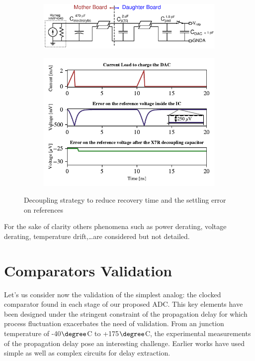 \begin{figure}[htp]
    \centering
    \begin{subfigure}[c]{0.8\textwidth}
        \includegraphics[width=\textwidth]{Chapter5/Figs/PCB/decoupling_cap_reference.ps}
    \end{subfigure}
    \begin{subfigure}[c]{0.8\textwidth}
        \includegraphics[width=\textwidth]{Chapter5/Figs/PCB/decap-reference-sar.pdf}
    \end{subfigure}
    \caption{Decoupling strategy to reduce recovery time and the settling error on references}
    \label{fig:decoupling-strategy}
\end{figure}

For the sake of clarity others phenomena such as power derating, voltage derating, temperature drift,\ldots are considered but not detailed.

\section{Comparators Validation}
Let's us consider now the validation of the simplest analog: the clocked comparator found in each stage of our proposed ADC\@. This key elements have been designed under the stringent constraint of the propagation delay for which process fluctuation exacerbates the need of validation. From an junction temperature of -40\(\degree \)C to +175\(\degree \)C, the experimental measurements of the propagation delay pose an interesting challenge. Earlier works have used simple as well as complex circuits for delay extraction. 

